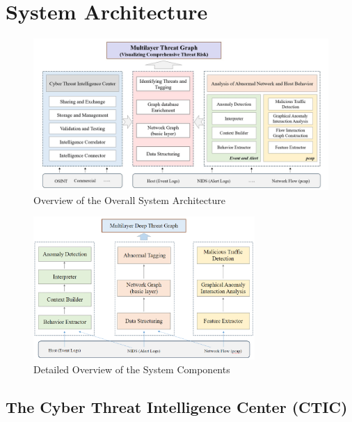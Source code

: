 \section{System Architecture}

\begin{figure}[!htbp]
    \centering
    \includegraphics[width=1\textwidth]{../images/Overall system architecture.jpg}
    \caption{Overview of the Overall System Architecture}
    \label{fig:overall_system_arch}
\end{figure}

\begin{figure}[!htbp]
    \centering
    \includegraphics[width=0.75\textwidth]{../images/System Architecture.png}
    \caption{Detailed Overview of the System Components}
    \label{fig:detailed_system_arch}
\end{figure}

\subsection{The Cyber Threat Intelligence Center (CTIC)}


